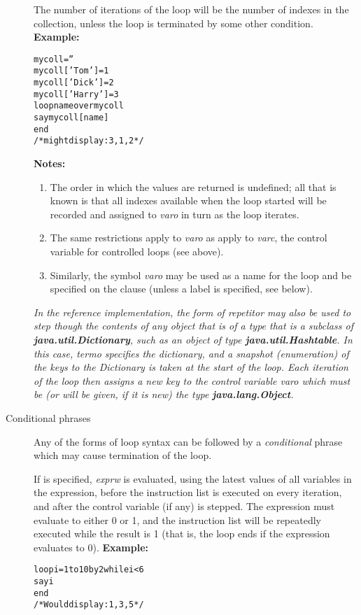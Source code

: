 \begin{description}
The number of iterations of the loop will be the number of indexes in
the collection, unless the loop is terminated by some other condition.
 \textbf{Example:}
\begin{alltt}
mycoll=''
mycoll['Tom']=1
mycoll['Dick']=2
mycoll['Harry']=3
loop name over mycoll
  say mycoll[name]
  end
/* might display: 3, 1, 2 */
\end{alltt}
 \textbf{Notes:}
\begin{enumerate}
\item 
The order in which the values are returned is undefined; all that
is known is that all indexes available when the loop started will be
recorded and assigned to \emph{varo} in turn as the loop iterates.
\item 
The same restrictions apply to \emph{varo} as apply to
\emph{varc}, the control variable for controlled loops (see above).
\item 
Similarly, the symbol \emph{varo} may be used as a name for the loop
and be specified on the  clause (unless a label is
specified, see below).
\end{enumerate}
 \emph{In the reference implementation, the  form of
repetitor may also be used to step though the contents of any object
that is of a type that is a subclass of \textbf{java.util.Dictionary},
such as an object of type \textbf{java.util.Hashtable}.
In this case, \emph{termo} specifies the dictionary, and a snapshot
(enumeration) of the keys to the Dictionary is taken at the start of the
loop.
Each iteration of the loop then assigns a new key to the control
variable \emph{varo} which must be (or will be given, if it is new)
the type \textbf{java.lang.Object}.
}
\item[Conditional phrases]\label{refloopwu}

Any of the forms of loop syntax can be followed by a
\emph{conditional} phrase which may cause termination of the loop.
 
If  is specified, \emph{exprw} is evaluated, using the
latest values of all variables in the expression, before the instruction
list is executed on every iteration, and after the control
variable (if any) is stepped.
The expression must evaluate to either 0 or 1, and the instruction list
will be repeatedly executed while the result is 1 (that is, the loop
ends if the expression evaluates to 0).
 \textbf{Example:}
\begin{alltt}
loop i=1 to 10 by 2 while i<6
  say i
  end
/* Would display: 1, 3, 5 */
\end{alltt}
 

\end{description}
